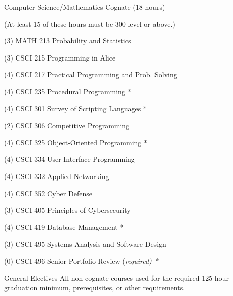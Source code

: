 \begin{reqgroup}{Computer Science/Mathematics Cognate (18 hours)}%
\begin{center}%
	(At least 15 of these hours must be 300 level or above.)\vspace{-0.5em}%
\end{center}%
\begin{checklist}%
\begin{minipage}[t]{0.5\linewidth}%
	\item (3) MATH 213 Probability and Statistics
	\item (3) CSCI 215 Programming in Alice
	\item (4) CSCI 217 Practical Programming and Prob. Solving
	\item (4) CSCI 235	Procedural Programming *
	\item (4) CSCI 301 Survey of Scripting Languages *
	\item (2) CSCI 306 Competitive Programming
	\item (4) CSCI 325 Object-Oriented Programming *
\end{minipage}%
\begin{minipage}[t]{0.5\linewidth}
	\item (4) CSCI 334 User-Interface Programming
	\item (4) CSCI 332 Applied Networking
	\item (4) CSCI 352 Cyber Defense
	\item (3) CSCI 405 Principles of Cybersecurity
	\item (4) CSCI 419 Database Management *
	\item (3) CSCI 495 Systems Analysis and Software Design
	\item (0) CSCI 496 Senior Portfolio Review (\em{required}) *
\end{minipage}
\end{checklist}
\end{reqgroup}

\begin{reqgroup}{General Electives}
All non-cognate courses used for the required 125-hour graduation minimum, prerequisites, or other requirements.
\end{reqgroup}

